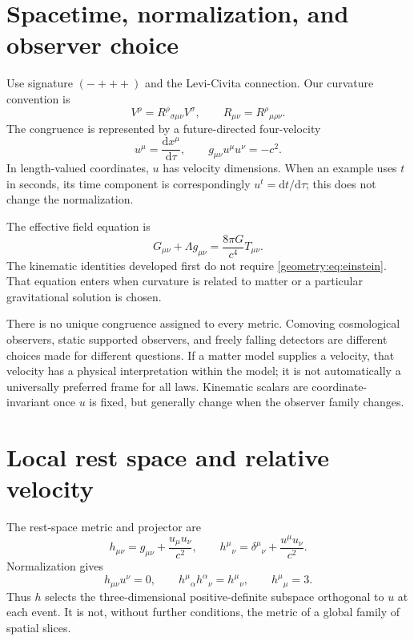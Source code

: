\documentclass[11pt,oneside]{report}
\newcommand{\dd}{\mathrm d}
\theoremstyle{remark}
\numberwithin{definition}{chapter}
\numberwithin{proposition}{chapter}
\numberwithin{remark}{chapter}
\begin{document}
\section{Spacetime, normalization, and observer choice}
Use signature $(-+++)$ and the Levi-Civita connection. Our curvature convention is
\begin{equation}
[\nabla_\mu,\nabla_\nu]V^\rho=R^\rho{}_{\sigma\mu\nu}V^\sigma,
\qquad R_{\mu\nu}=R^\rho{}_{\mu\rho\nu}.
\end{equation}
The congruence is represented by a future-directed four-velocity
\begin{equation}
u^\mu=\frac{\dd x^\mu}{\dd\tau},\qquad g_{\mu\nu}u^\mu u^\nu=-c^2.
\label{geometry:eq:unitnorm}
\end{equation}
In length-valued coordinates, $u$ has velocity dimensions. When an example uses $t$ in seconds, its time component is correspondingly $u^t=\dd t/\dd\tau$; this does not change the normalization.

The effective field equation is
\begin{equation}
G_{\mu\nu}+\Lambda g_{\mu\nu}=\frac{8\pi G}{c^4}T_{\mu\nu}.
\label{geometry:eq:einstein}
\end{equation}
The kinematic identities developed first do not require \eqref{geometry:eq:einstein}. That equation enters when curvature is related to matter or a particular gravitational solution is chosen.

There is no unique congruence assigned to every metric. Comoving cosmological observers, static supported observers, and freely falling detectors are different choices made for different questions. If a matter model supplies a velocity, that velocity has a physical interpretation within the model; it is not automatically a universally preferred frame for all laws. Kinematic scalars are coordinate-invariant once $u$ is fixed, but generally change when the observer family changes.

\section{Local rest space and relative velocity}
The rest-space metric and projector are
\begin{equation}
h_{\mu\nu}=g_{\mu\nu}+\frac{u_\mu u_\nu}{c^2},\qquad
h^\mu{}_{\nu}=\delta^\mu{}_{\nu}+\frac{u^\mu u_\nu}{c^2}.
\label{geometry:eq:projector}
\end{equation}
Normalization gives
\begin{equation}
h_{\mu\nu}u^\nu=0,\qquad
h^\mu{}_{\alpha}h^\alpha{}_{\nu}=h^\mu{}_{\nu},\qquad
h^\mu{}_{\mu}=3.
\label{geometry:eq:projectorprops}
\end{equation}
Thus $h$ selects the three-dimensional positive-definite subspace orthogonal to $u$ at each event. It is not, without further conditions, the metric of a global family of spatial slices.
\end{document}
